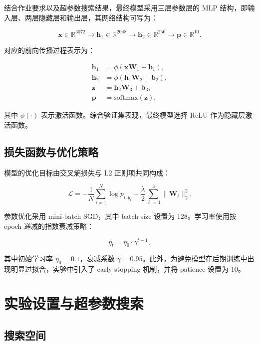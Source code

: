 \documentclass[UTF8,a4paper,11pt]{ctexart}
\begin{document}
结合作业要求以及超参数搜索结果，最终模型采用三层参数层的 MLP 结构，即输入层、两层隐藏层和输出层，其网络结构可写为：

\begin{equation}
\bm{x} \in \mathbb{R}^{3072}
\rightarrow
\bm{h}_1 \in \mathbb{R}^{2048}
\rightarrow
\bm{h}_2 \in \mathbb{R}^{256}
\rightarrow
\bm{p} \in \mathbb{R}^{10}.
\end{equation}

对应的前向传播过程表示为：

\begin{align}
\bm{h}_1 &= \phi(\bm{x}\bm{W}_1 + \bm{b}_1), \\
\bm{h}_2 &= \phi(\bm{h}_1\bm{W}_2 + \bm{b}_2), \\
\bm{z}   &= \bm{h}_2\bm{W}_3 + \bm{b}_3, \\
\bm{p}   &= \text{softmax}(\bm{z}),
\end{align}

其中 $\phi(\cdot)$ 表示激活函数。综合验证集表现，最终模型选择 ReLU 作为隐藏层激活函数。

\subsection{损失函数与优化策略}

模型的优化目标由交叉熵损失与 L2 正则项共同构成：

\begin{equation}
\mathcal{L}
=
-\frac{1}{N}\sum_{i=1}^{N}\log p_{i,y_i}
+
\frac{\lambda}{2}\sum_{\ell=1}^{3}\|\bm{W}_{\ell}\|_2^2.
\end{equation}

参数优化采用 mini-batch SGD，其中 batch size 设置为 128。学习率使用按 epoch 递减的指数衰减策略：

\begin{equation}
\eta_t = \eta_0 \cdot \gamma^{t-1},
\end{equation}

其中初始学习率 $\eta_0 = 0.1$，衰减系数 $\gamma = 0.95$。此外，为避免模型在后期训练中出现明显过拟合，实验中引入了 early stopping 机制，并将 patience 设置为 10。

\section{实验设置与超参数搜索}

\subsection{搜索空间}
\end{document}

